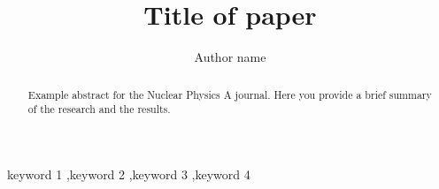 \documentclass[final,5p,times,twocolumn,authoryear]{elsarticle}
\begin{document}
\begin{frontmatter}



\title{Title of paper}


\author[first]{Author name}

\begin{abstract}
Example abstract for the Nuclear Physics A journal. Here you provide a brief summary of the research and the results.
\end{abstract}



\begin{keyword}
keyword 1 \sep keyword 2 \sep keyword 3 \sep keyword 4



\end{keyword}


\end{frontmatter}
\end{document}
